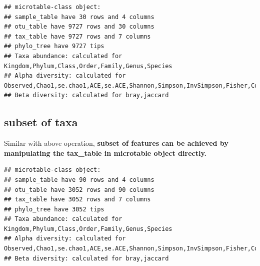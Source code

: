 \documentclass[
]{book}
\newenvironment{Shaded}{\begin{snugshade}}{\end{snugshade}}
\newcommand{\CommentTok}[1]{\textcolor[rgb]{0.56,0.35,0.01}{\textit{#1}}}
\newcommand{\FunctionTok}[1]{\textcolor[rgb]{0.00,0.00,0.00}{#1}}
\newcommand{\NormalTok}[1]{#1}
\newcommand{\OtherTok}[1]{\textcolor[rgb]{0.56,0.35,0.01}{#1}}
\newcommand{\SpecialCharTok}[1]{\textcolor[rgb]{0.00,0.00,0.00}{#1}}
\newcommand{\StringTok}[1]{\textcolor[rgb]{0.31,0.60,0.02}{#1}}
\begin{document}
\begin{verbatim}
## microtable-class object:
## sample_table have 30 rows and 4 columns
## otu_table have 9727 rows and 30 columns
## tax_table have 9727 rows and 7 columns
## phylo_tree have 9727 tips
## Taxa abundance: calculated for Kingdom,Phylum,Class,Order,Family,Genus,Species 
## Alpha diversity: calculated for Observed,Chao1,se.chao1,ACE,se.ACE,Shannon,Simpson,InvSimpson,Fisher,Coverage 
## Beta diversity: calculated for bray,jaccard
\end{verbatim}

\hypertarget{subset-of-taxa}{%
\subsection{subset of taxa}\label{subset-of-taxa}}

Similar with above operation, \textbf{subset of features can be achieved by manipulating the tax\_table in microtable object directly.}

\begin{Shaded}
\end{Shaded}

\begin{verbatim}
## microtable-class object:
## sample_table have 90 rows and 4 columns
## otu_table have 3052 rows and 90 columns
## tax_table have 3052 rows and 7 columns
## phylo_tree have 3052 tips
## Taxa abundance: calculated for Kingdom,Phylum,Class,Order,Family,Genus,Species 
## Alpha diversity: calculated for Observed,Chao1,se.chao1,ACE,se.ACE,Shannon,Simpson,InvSimpson,Fisher,Coverage 
## Beta diversity: calculated for bray,jaccard
\end{verbatim}

\begin{Shaded}
\end{Shaded}
\end{document}
